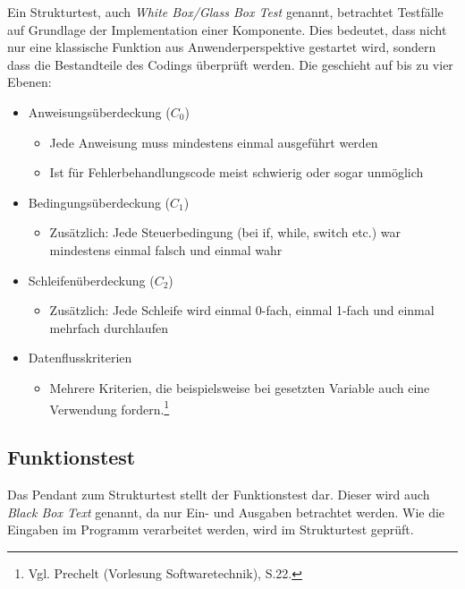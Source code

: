             Ein Strukturtest, auch \emph{White Box/Glass Box Test} genannt, betrachtet Testfälle auf Grundlage der Implementation einer Komponente.
            Dies bedeutet, dass nicht nur eine klassische Funktion aus Anwenderperspektive gestartet wird, sondern dass die Bestandteile des Codings überprüft werden. Die geschieht auf bis zu vier Ebenen:
            \begin{itemize}
                \item Anweisungsüberdeckung ($C_0$)
                \begin{itemize}
                    \item Jede Anweisung muss mindestens einmal ausgeführt werden
                    \item Ist für Fehlerbehandlungscode meist schwierig oder sogar unmöglich
                \end{itemize}
                \item Bedingungsüberdeckung ($C_1$)
                \begin{itemize}
                    \item Zusätzlich: Jede Steuerbedingung (bei if, while, switch etc.) war mindestens einmal falsch und einmal wahr
                \end{itemize}
                \item Schleifenüberdeckung ($C_2$)
                \begin{itemize}
                    \item Zusätzlich: Jede Schleife wird einmal 0-fach, einmal 1-fach und einmal mehrfach durchlaufen
                \end{itemize}
                \item Datenflusskriterien
                \begin{itemize}
                    \item Mehrere Kriterien, die beispielsweise bei gesetzten Variable auch eine Verwendung fordern.\footnote{Vgl. Prechelt (Vorlesung Softwaretechnik), S.22.}
                \end{itemize}
                \end{itemize}

        \subsection{Funktionstest}

            Das Pendant zum Strukturtest stellt der Funktionstest dar. Dieser wird auch \emph{Black Box Text} genannt, da nur Ein- und Ausgaben betrachtet werden. Wie die Eingaben im Programm verarbeitet werden, wird im Strukturtest geprüft.

